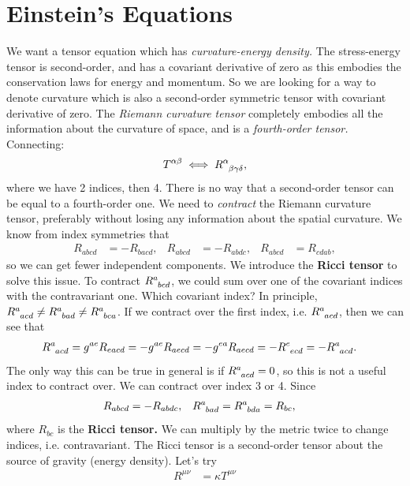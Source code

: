 \documentclass[a4paper, 11pt, normalem]{report}
\begin{document}
\section{Einstein's Equations}
We want a tensor equation which has \emph{curvature-energy density.}
The stress-energy tensor is second-order, and has a covariant derivative of zero as this embodies the conservation laws for energy and momentum. 
So we are looking for a way to denote curvature which is also a second-order symmetric tensor with covariant derivative of zero. 
The \emph{Riemann curvature tensor} completely embodies all the information about the curvature of space, and is a \emph{fourth-order tensor.}
Connecting:
\begin{align}
    T^{\alpha\beta} \iff \tensor{R}{^\alpha_{\beta\gamma\delta}},
\end{align}
where we have 2 indices, then 4.
There is no way that a second-order tensor can be equal to a fourth-order one. 
We need to \emph{contract} the Riemann curvature tensor, preferably without losing any information about the spatial curvature. 
We know from index symmetries that
\begin{align}
    R_{abcd} &= -R_{bacd}, & R_{abcd} &= -R_{abdc}, & R_{abcd} &= R_{cdab},
\end{align}
so we can get fewer independent components.
We introduce the \textbf{Ricci tensor} to solve this issue. 
To contract $\tensor{R}{^a_{bcd}}$, we could sum over one of the covariant indices with the contravariant one. 
Which covariant index? 
In principle, $\tensor{R}{^a_{acd}}\neq\tensor{R}{^a_{bad}}\neq\tensor{R}{^a_{bca}}$.
If we contract over the first index, i.e. $\tensor{R}{^a_{acd}}$, then we can see that
\begin{align}
    \tensor{R}{^a_{acd}} &= g^{ae}R_{eacd} = -g^{ae}R_{aecd} = -g^{ea}R_{aecd} = -\tensor{R}{^e_{ecd}} = -\tensor{R}{^a_{acd}}.
\end{align}
The only way this can be true in general is if $\tensor{R}{^a_{acd}}=0$, so this is not a useful index to contract over. 
We can contract over index 3 or 4.
Since 
\begin{align}
    R_{abcd} &= -R_{abdc}, & \tensor{R}{^a_{bad}} &= \tensor{R}{^a_{bda}} = R_{bc},
\end{align}
where $R_{bc}$ is the \textbf{Ricci tensor.}
We can multiply by the metric twice to change indices, i.e. contravariant. 
The Ricci tensor is a second-order tensor about the source of gravity (energy density).
Let's try
\begin{align}
    R^{\mu\nu} &= \kappa T^{\mu\nu}
\end{align}
\end{document}
